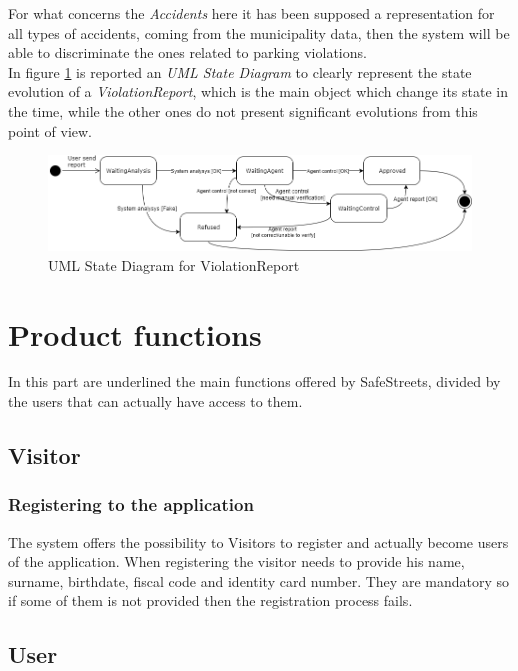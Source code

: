 \documentclass[a4paper]{report}
\begin{document}
For what concerns the \textit{Accidents} here it has been supposed a representation for all types of accidents, coming from the municipality data, then the system will be able to discriminate the ones related to parking violations.\\
In figure \ref{fig:state-diagram1} is reported an \textit{UML State Diagram} to clearly represent the state evolution of a \textit{ViolationReport}, which is the main object which change its state in the time, while the other ones do not present significant evolutions from this point of view.
\begin{figure}[hp]
\centering
\includegraphics[angle=90, scale=0.6]{StateReport}
\caption{UML State Diagram for ViolationReport}
\label{fig:state-diagram1}
\end{figure}
\section{Product functions}

In this part are underlined the main functions offered by SafeStreets, divided by the users that can actually have access to them.

\subsection{Visitor}

\subsubsection{Registering to the application}

The system offers the possibility to Visitors to register and actually become users of the application. When registering the visitor needs to provide his name, surname, birthdate, fiscal code and identity card number. They are mandatory so if some of them is not provided then the registration process fails.
 
\subsection{User}
\end{document}
